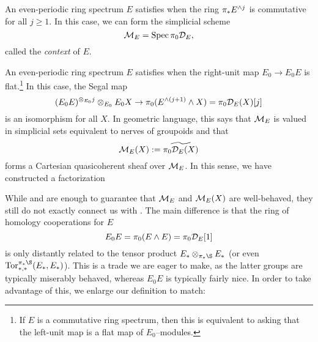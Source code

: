 \begin{definition}
An even-periodic ring spectrum \(E\) satisfies  when the ring \(\pi_* E^{\wedge j}\) is commutative for all \(j \ge 1\).  In this case, we can form the simplicial scheme \[\mathcal{M}_{E} = \operatorname{Spec} \pi_0 \mathcal D_E,\] called the \textit{context} of \(E\).
\end{definition}

\begin{definition}
An even-periodic ring spectrum \(E\) satisfies  when the right-unit map \(E_0 \to E_0 E\) is flat.\footnote{If \(E\) is a commutative ring spectrum, then this is equivalent to asking that the left-unit map is a flat map of \(E_0\)--modules.}  In this case, the Segal map \[(E_0 E)^{\otimes_{E_0} j} \otimes_{E_0} E_0 X \to \pi_0(E^{\wedge (j+1)} \wedge X) = \pi_0 \mathcal D_E(X)[j]\] is an isomorphism for all \(X\).  In geometric language, this says that \(\mathcal{M}_{E}\) is valued in simplicial sets equivalent to nerves of groupoids and that \[\mathcal{M}_{E}(X) := \widetilde{\pi_0 \mathcal D_E(X)}\] forms a Cartesian quasicoherent sheaf over \(\mathcal{M}_{E}\).  In this sense, we have constructed a factorization
\begin{center}
\end{center}
\end{definition}

While {\CH} and {\FH} are enough to guarantee that \(\mathcal{M}_{E}\) and \(\mathcal{M}_{E}(X)\) are well-behaved, they still do not exactly connect us with .  The main difference is that the ring of homology cooperations for \(E\) \[E_0 E = \pi_0(E \wedge E) = \pi_0 \mathcal D_E[1]\] is only distantly related to the tensor product \(E_* \otimes_{\pi_* \S} E_*\) (or even \(\Tor^{\pi_* \S}_{*, *}(E_*, E_*)\)).  This is a trade we are eager to make, as the latter groups are typically miserably behaved, whereas \(E_0 E\) is typically fairly nice.  In order to take advantage of this, we enlarge our definition to match:

